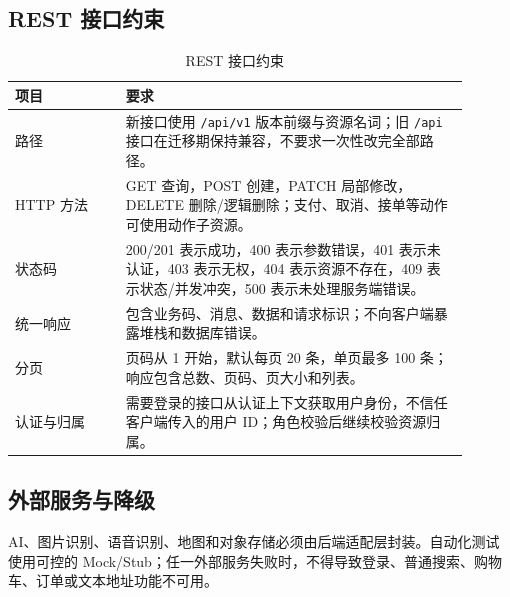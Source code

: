 \subsection{REST 接口约束}

\begin{longtable}{|L{0.22\linewidth}|L{0.68\linewidth}|}
\caption{REST 接口约束}\label{tab:rest-constraints}\\ \hline
\textbf{项目} & \textbf{要求} \\ \hline
路径 & 新接口使用 \texttt{/api/v1} 版本前缀与资源名词；旧 \texttt{/api} 接口在迁移期保持兼容，不要求一次性改完全部路径。 \\ \hline
HTTP 方法 & GET 查询，POST 创建，PATCH 局部修改，DELETE 删除/逻辑删除；支付、取消、接单等动作可使用动作子资源。 \\ \hline
状态码 & 200/201 表示成功，400 表示参数错误，401 表示未认证，403 表示无权，404 表示资源不存在，409 表示状态/并发冲突，500 表示未处理服务端错误。 \\ \hline
统一响应 & 包含业务码、消息、数据和请求标识；不向客户端暴露堆栈和数据库错误。 \\ \hline
分页 & 页码从 1 开始，默认每页 20 条，单页最多 100 条；响应包含总数、页码、页大小和列表。 \\ \hline
认证与归属 & 需要登录的接口从认证上下文获取用户身份，不信任客户端传入的用户 ID；角色校验后继续校验资源归属。 \\ \hline
\end{longtable}

\subsection{外部服务与降级}


AI、图片识别、语音识别、地图和对象存储必须由后端适配层封装。自动化测试使用可控的 Mock/Stub；任一外部服务失败时，不得导致登录、普通搜索、购物车、订单或文本地址功能不可用。
